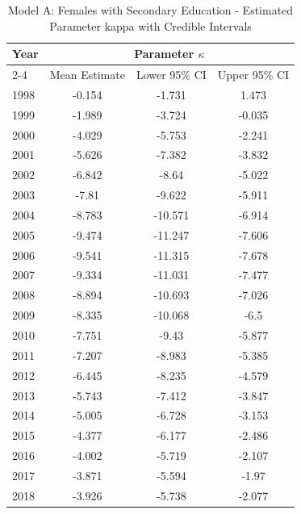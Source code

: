 \begin{landscape}
\begin{table}[htbp]
\centering
\caption{Model A: Females with Secondary Education - Estimated Parameter kappa  with Credible Intervals}
\label{tab:parameters_k3}
\begin{tabular}{@{}lccc@{}}
\toprule
Year & \multicolumn{3}{c}{Parameter \(\kappa\)} \\
\cmidrule(lr){2-4}
      & Mean Estimate & Lower 95\% CI & Upper 95\% CI \\
\midrule
1998 & -0.154 & -1.731 & 1.473 \\
1999 & -1.989 & -3.724 & -0.035 \\
2000 & -4.029 & -5.753 & -2.241 \\
2001 & -5.626 & -7.382 & -3.832 \\
2002 & -6.842 & -8.64 & -5.022 \\
2003 & -7.81 & -9.622 & -5.911 \\
2004 & -8.783 & -10.571 & -6.914 \\
2005 & -9.474 & -11.247 & -7.606 \\
2006 & -9.541 & -11.315 & -7.678 \\
2007 & -9.334 & -11.031 & -7.477 \\
2008 & -8.894 & -10.693 & -7.026 \\
2009 & -8.335 & -10.068 & -6.5 \\
2010 & -7.751 & -9.43 & -5.877 \\
2011 & -7.207 & -8.983 & -5.385 \\
2012 & -6.445 & -8.235 & -4.579 \\
2013 & -5.743 & -7.412 & -3.847 \\
2014 & -5.005 & -6.728 & -3.153 \\
2015 & -4.377 & -6.177 & -2.486 \\
2016 & -4.002 & -5.719 & -2.107 \\
2017 & -3.871 & -5.594 & -1.97 \\
2018 & -3.926 & -5.738 & -2.077 \\
\bottomrule
\end{tabular}
\end{table}
\end{landscape}